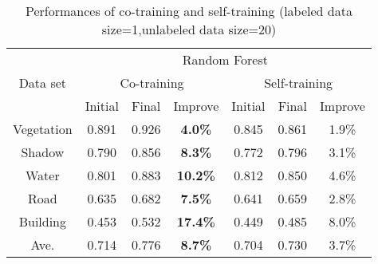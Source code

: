 \documentclass{article}
\begin{document}
\begin{table}[]
\begin{center}
\begin{tabular}{c|ccc|ccc}
\toprule
\multirow{3}{*}{Data set} & \multicolumn{6}{c}{Random Forest}                                  \\
\cline{2-7}
                          & \multicolumn{3}{c|}{Co-training}      & \multicolumn{3}{c}{Self-training} \\
\cline{2-7}
                          & Initial & Final & Improve         & Initial   & Final   & Improve  \\
\midrule
Vegetation                & 0.891    & 0.926  & \textbf{4.0\%}  & 0.845      & 0.861    & 1.9\%   \\
Shadow                    & 0.790    & 0.856  & \textbf{8.3\%}  & 0.772      & 0.796    & 3.1\%   \\
Water                     & 0.801    & 0.883  & \textbf{10.2\%} & 0.812      & 0.850    & 4.6\%   \\
Road                      & 0.635    & 0.682  & \textbf{7.5\%}  & 0.641      & 0.659    & 2.8\%    \\
Building                  & 0.453    & 0.532  & \textbf{17.4\%} & 0.449      & 0.485    & 8.0\%    \\
\midrule
Ave.                      & 0.714    & 0.776  & \textbf{8.7\%}  & 0.704      & 0.730    & 3.7\%   \\
\bottomrule
\end{tabular}
\caption{Performances of co-training and self-training (labeled data size=1,unlabeled data size=20)}
\end{center}
\end{table}
\end{document}
